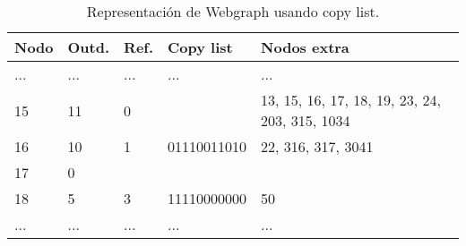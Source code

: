 \begin{table}[t]
\caption{Representación de Webgraph usando copy list.}
\label{table:webgraph2}
\centering
\scriptsize

\begin{tabular}{|l|l|l|l|l|}
	\toprule
	Nodo & Outd. & Ref. & Copy list & Nodos extra \\
	\midrule
	... & ... & ... & ... & ... \\
	15 & 11 & 0 &  & 13, 15, 16, 17, 18, 19, 23, 24, 203, 315, 1034 \\
	16 & 10 & 1 & 01110011010 & 22, 316, 317, 3041 \\
	17 & 0 &  &  &  \\
	18 & 5 & 3 & 11110000000 & 50 \\
	... & ... & ... & ... & ... \\
\end{tabular}
\end{table} 
 